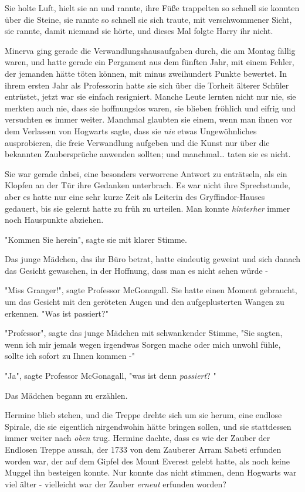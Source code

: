 {Sie holte Luft, hielt sie an und rannte, ihre Füße trappelten so schnell sie konnten über die Steine, sie rannte so schnell sie sich traute, mit verschwommener Sicht, sie rannte, damit niemand sie hörte, und dieses Mal folgte Harry ihr nicht.

Minerva ging gerade die Verwandlungshausaufgaben durch, die am Montag fällig waren, und hatte gerade ein Pergament aus dem fünften Jahr, mit einem Fehler, der jemanden hätte töten können, mit minus zweihundert Punkte bewertet. In ihrem ersten Jahr als Professorin hatte sie sich über die Torheit älterer Schüler entrüstet, jetzt war sie einfach resigniert. Manche Leute lernten nicht nur nie, sie merkten auch nie, dass sie hoffnungslos waren, sie blieben fröhlich und eifrig und versuchten es immer weiter. Manchmal glaubten sie einem, wenn man ihnen vor dem Verlassen von Hogwarts sagte, dass sie \emph{nie} etwas Ungewöhnliches ausprobieren, die freie Verwandlung aufgeben und die Kunst nur über die bekannten Zaubersprüche anwenden sollten; und manchmal… taten sie es nicht.

Sie war gerade dabei, eine besonders verworrene Antwort zu enträtseln, als ein Klopfen an der Tür ihre Gedanken unterbrach. Es war nicht ihre Sprechstunde, aber es hatte nur eine sehr kurze Zeit als Leiterin des Gryffindor-Hauses gedauert, bis sie gelernt hatte zu früh zu urteilen. Man konnte \emph{hinterher} immer noch Hauspunkte abziehen.

"Kommen Sie herein", sagte sie mit klarer Stimme.

Das junge Mädchen, das ihr Büro betrat, hatte eindeutig geweint und sich danach das Gesicht gewaschen, in der Hoffnung, dass man es nicht sehen würde -

"Miss Granger!", sagte Professor McGonagall. Sie hatte einen Moment gebraucht, um das Gesicht mit den geröteten Augen und den aufgeplusterten Wangen zu erkennen. "Was ist passiert?"

"Professor", sagte das junge Mädchen mit schwankender Stimme, "Sie sagten, wenn ich mir jemals wegen irgendwas Sorgen mache oder mich unwohl fühle, sollte ich sofort zu Ihnen kommen -"

"Ja", sagte Professor McGonagall, "was ist denn \emph{passiert}? "

Das Mädchen begann zu erzählen.

Hermine blieb stehen, und die Treppe drehte sich um sie herum, eine endlose Spirale, die sie eigentlich nirgendwohin hätte bringen sollen, und sie stattdessen immer weiter nach \emph{oben} trug. Hermine dachte, dass es wie der Zauber der Endlosen Treppe aussah, der 1733 von dem Zauberer Arram Sabeti erfunden worden war, der auf dem Gipfel des Mount Everest gelebt hatte, als noch keine Muggel ihn besteigen konnte. Nur konnte das nicht stimmen, denn Hogwarts war viel älter - vielleicht war der Zauber \emph{erneut} erfunden worden?

}
